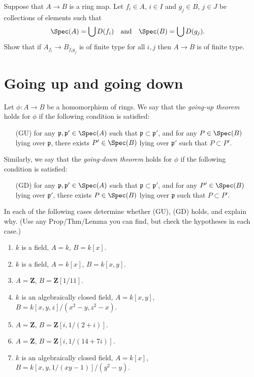 \begin{exercise}
\label{exercise-cover-ring-map}
Suppose that $A \to B$ is a ring map.
Let $f_i \in A$, $i \in I$ and $g_j \in B$, $j \in J$ be collections of
elements such that
$$
\Spec(A) = \bigcup D(f_i)
\quad\text{and}\quad
\Spec(B) = \bigcup D(g_j).
$$
Show that if $A_{f_i} \to B_{f_ig_j}$ is of finite type for all $i, j$
then $A \to B$ is of finite type.
\end{exercise}




\section{Going up and going down}
\label{section-going-up}


\begin{definition}
\label{definition-GU-GD}
Let $\phi : A \to B$ be a homomorphism of rings. We say
that the {\it going-up theorem} holds for $\phi$ if the
following condition is satisfied:
\begin{itemize}
\item[(GU)] for any ${\mathfrak p}, {\mathfrak p}' \in \Spec(A)$ such that
${\mathfrak p} \subset {\mathfrak p}'$, and for any $P \in \Spec(B)$ lying
over ${\mathfrak p}$, there exists $P'\in \Spec(B)$ lying
over ${\mathfrak p}'$ such that $P \subset P'$.
\end{itemize}
Similarly, we say that the {\it going-down theorem} holds for $\phi$
if the following condition is satisfied:
\begin{itemize}
\item[(GD)] for any ${\mathfrak p}, {\mathfrak p}' \in \Spec(A)$ such that
${\mathfrak p} \subset {\mathfrak p}'$, and for any
$P' \in \Spec(B)$ lying
over ${\mathfrak p}'$, there exists $P\in \Spec(B)$ lying
over ${\mathfrak p}$ such that $P \subset P'$.
\end{itemize}
\end{definition}

\begin{exercise}
\label{exercise-GU-GD}
In each of the following cases determine whether
(GU), (GD) holds, and explain why. (Use any Prop/Thm/Lemma you can find,
but check the hypotheses in each case.)
\begin{enumerate}
\item $k$ is a field, $A = k$, $B = k[x]$.
\item $k$ is a field, $A = k[x]$, $B = k[x, y]$.
\item $A = {\mathbf Z}$, $B = {\mathbf Z}[1/11]$.
\item $k$ is an algebraically closed field, $A = k[x, y]$,
$B = k[x, y, z]/(x^2-y, z^2-x)$.
\item $A = {\mathbf Z}$, $B = {\mathbf Z}[i, 1/(2 + i)]$.
\item $A = {\mathbf Z}$, $B = {\mathbf Z}[i, 1/(14 + 7i)]$.
\item $k$ is an algebraically closed field, $A = k[x]$,
$B = k[x, y, 1/(xy-1)]/(y^2-y)$.
\end{enumerate}
\end{exercise}

